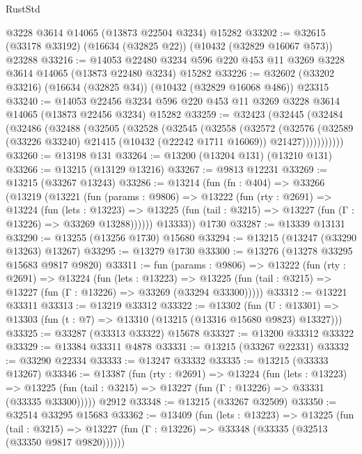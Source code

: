 \begin{lexlean}{RustStd}
\begin{coremodule}
    @3228
    @3614
    @14065
    (@13873 @22504 @3234)
    @15282
@33202 := @32615 (@33178 @33192) (@16634 (@32825 @22)) (@10432 (@32829 @16067 @573)) @23288
@33216 := @14053
    @22480
    @3234
    @596
    @220
    @453
    @11
    @3269
    @3228
    @3614
    @14065
    (@13873 @22480 @3234)
    @15282
@33226 := @32602 (@33202 @33216) (@16634 (@32825 @34)) (@10432 (@32829 @16068 @486)) @23315
@33240 := @14053
    @22456
    @3234
    @596
    @220
    @453
    @11
    @3269
    @3228
    @3614
    @14065
    (@13873 @22456 @3234)
    @15282
@33259 := @32423
    (@32445
      (@32484
        (@32486
          (@32488
            (@32505
              (@32528
                (@32545
                  (@32558
                    (@32572
                      (@32576
                        (@32589
                          (@33226 @33240)
                          @21415
                          (@10432 (@22242 @1711 @16069))
                          @21427)))))))))))
@33260 := @13198 @131
@33264 := @13200 (@13204 @131) (@13210 @131)
@33266 := @13215 (@13129 @13216)
@33267 := @9813 @12231
@33269 := @13215 (@33267 @13243)
@33286 := @13214
    (fun (fn : @404) =>
    @33266
      (@13219
        (@13221
          (fun (params : @9806) =>
          @13222
            (fun (rty : @2691) =>
            @13224
              (fun (lets : @13223) =>
              @13225 (fun (tail : @3215) => @13227 (fun (Γ : @13226) => @33269 @13288))))))
        @13333))
    @1730
@33287 := @13339 @13131
@33290 := @13255 (@13256 @1730) @15680
@33294 := @13215 (@13247 (@33290 @13263) @13267)
@33295 := @13279 @1730
@33300 := @13276 (@13278 @33295 @15683 @9817 @9820)
@33311 := fun (params : @9806) =>
  @13222
    (fun (rty : @2691) =>
    @13224
      (fun (lets : @13223) =>
      @13225 (fun (tail : @3215) => @13227 (fun (Γ : @13226) => @33269 (@33294 @33300)))))
@33312 := @13221 @33311
@33313 := @13219 @33312
@33322 := @13302
    (fun (U : @13301) => @13303 (fun (t : @7) => @13310 (@13215 (@13316 @15680 @9823) @13327)))
@33325 := @33287 (@33313 @33322) @15678
@33327 := @13200 @33312 @33322
@33329 := @13384 @33311 @4878
@33331 := @13215 (@33267 @22331)
@33332 := @33290 @22334
@33333 := @13247 @33332
@33335 := @13215 (@33333 @13267)
@33346 := @13387
    (fun (rty : @2691) =>
    @13224
      (fun (lets : @13223) =>
      @13225 (fun (tail : @3215) => @13227 (fun (Γ : @13226) => @33331 (@33335 @33300)))))
    @2912
@33348 := @13215 (@33267 @32509)
@33350 := @32514 @33295 @15683
@33362 := @13409
    (fun (lets : @13223) =>
    @13225
      (fun (tail : @3215) =>
      @13227 (fun (Γ : @13226) => @33348 (@33335 (@32513 (@33350 @9817 @9820))))))

\end{coremodule}
\end{lexlean}
